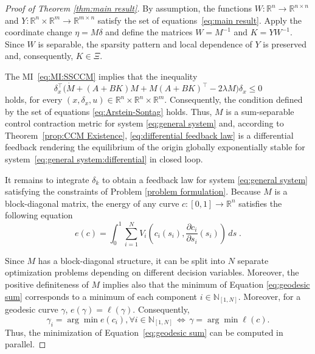 \documentclass[10pt,twocolumn,twoside]{IEEEtran}
\newcounter{para}
\newcommand\mypara{\par}
\theoremstyle{plain}
\theoremstyle{definition}
\theoremstyle{remark}
\begin{document}
\begin{proof}[Proof of Theorem \ref{thm:main result}]
	By assumption, the functions $W:\mathbb{R}^n\to\mathbb{R}^{n\times n}$ and $Y:\mathbb{R}^n\times\mathbb{R}^m\to\mathbb{R}^{m\times n}$ satisfy the set of equations~\eqref{eq:main result}. Apply the coordinate change $\eta=M\delta$ and define the matrices $W=M^{-1}$ and $K=YW^{-1}$. Since $W$ is separable, the sparsity pattern and local dependence of $Y$ is preserved and, consequently, $K\in\Xi$.
	
\mypara	The MI~\eqref{eq:MI:SSCCM} implies that the inequality
	\begin{equation*}
		\delta_x^\top\bigg(\dot{M}+(A+BK)M+M(A+BK)^\top-2\lambda M\bigg)\delta_x\leq0
	\end{equation*}
	holds, for every $(x,\delta_x,u)\in\mathbb{R}^n\times\mathbb{R}^n\times\mathbb{R}^m$. Consequently, the condition defined by the set of equations \eqref{eq:Arstein-Sontag} holds. Thus, $M$ is a sum-separable control contraction metric for system \eqref{eq:general system} and, according to Theorem~\ref{prop:CCM Existence}, \eqref{eq:differential feedback law} is a differential feedback rendering the equilibrium of the origin globally exponentially stable for system~\eqref{eq:general system:differential} in closed loop.
	
	
	
\mypara 	It remains to integrate $\delta_k$ to obtain a feedback law for system \eqref{eq:general system} satisfying the constraints of Problem \ref{problem formulation}. Because $M$ is a block-diagonal matrix, the energy of any curve $c:[0,1]\to\mathbb{R}^n$ satisfies the following equation
	\begin{equation}\label{eq:geodesic sum}
		e(c)=\int_0^1\sum_{i=1}^N V_i\left(c_i(s_i),\frac{\partial c_i}{\partial s_i}(s_i)\right)\,ds\;.
	\end{equation}

	
\mypara Since $M$ has a block-diagonal structure, it can be split into $N$ separate optimization problems depending on
different decision variables. Moreover, the positive definiteness of $M$ implies also that the minimum of Equation \eqref{eq:geodesic sum} corresponds to a minimum of each component $i\in\mathbb{N}_{[1,N]}$. Moreover, for a geodesic curve $\gamma$, $e(\gamma)=\ell(\gamma)$. Consequently,
	\begin{equation*}
		\gamma_i=\arg\min e(c_i),\forall i\in\mathbb{N}_{[1,N]}\,\Leftrightarrow\,\gamma=\arg\min\ell(c).
	\end{equation*}
	Thus, the minimization of Equation~\eqref{eq:geodesic sum} can be computed in parallel. 
	

\end{proof}
\end{document}
